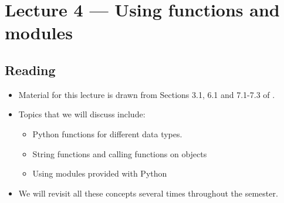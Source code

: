 \documentclass[letterpaper,10pt,english]{sphinxmanual}
\begin{document}
\begin{quote}

%
\begin{sphinxVerbatim}[commandchars=\\\{\}]
 

\end{sphinxVerbatim}
\end{quote}


\chapter{Lecture 4 — Using functions and modules}
\label{\detokenize{lecture_notes/lec04_modules_functions1:lecture-4-using-functions-and-modules}}\label{\detokenize{lecture_notes/lec04_modules_functions1::doc}}

\section{Reading}
\label{\detokenize{lecture_notes/lec04_modules_functions1:reading}}\begin{itemize}
\item {} 
Material for this lecture is drawn from Sections 3.1, 6.1 and
7.1-7.3 of .

\item {} 
Topics that we will discuss include:
\begin{itemize}
\item {} 
Python functions for different data types.

\item {} 
String functions and calling functions on objects

\item {} 
Using modules provided with Python

\end{itemize}

\item {} 
We will revisit all these concepts several times throughout the semester.

\end{itemize}
\end{document}
